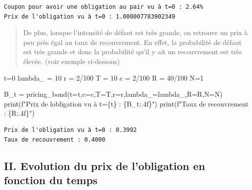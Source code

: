 \documentclass[
  letterpaper,
  DIV=11,
  numbers=noendperiod]{scrartcl}
\newenvironment{Shaded}{\begin{snugshade}}{\end{snugshade}}
\newcommand{\BuiltInTok}[1]{\textcolor[rgb]{0.00,0.23,0.31}{#1}}
\newcommand{\DecValTok}[1]{\textcolor[rgb]{0.68,0.00,0.00}{#1}}
\newcommand{\NormalTok}[1]{\textcolor[rgb]{0.00,0.23,0.31}{#1}}
\newcommand{\OperatorTok}[1]{\textcolor[rgb]{0.37,0.37,0.37}{#1}}
\newcommand{\SpecialCharTok}[1]{\textcolor[rgb]{0.37,0.37,0.37}{#1}}
\newcommand{\SpecialStringTok}[1]{\textcolor[rgb]{0.13,0.47,0.30}{#1}}
\begin{document}
\begin{verbatim}
Coupon pour avoir une obligation au pair vu à t=0 : 2.64%
Prix de l'obligation vu à t=0 : 1.000007783902349
\end{verbatim}

\begin{quote}
De plus, lorsque l'intensité de défaut est très grande, on retrouve un
prix à peu près égal au taux de recouvrement. En effet, la probabilité
de défaut est très grande et donc la probabilité qu'il y ait un
recouvrement est très élevée. (voir exemple ci-dessous)
\end{quote}

\begin{Shaded}
\begin{Highlighting}[]
\NormalTok{t}\OperatorTok{=}\DecValTok{0}
\NormalTok{lambda\_ }\OperatorTok{=} \DecValTok{10}
\NormalTok{r }\OperatorTok{=} \DecValTok{2}\OperatorTok{/}\DecValTok{100}
\NormalTok{T }\OperatorTok{=} \DecValTok{10}
\NormalTok{c }\OperatorTok{=} \DecValTok{2}\OperatorTok{/}\DecValTok{100}
\NormalTok{R }\OperatorTok{=} \DecValTok{40}\OperatorTok{/}\DecValTok{100}
\NormalTok{N}\OperatorTok{=}\DecValTok{1}


\NormalTok{B\_t }\OperatorTok{=}\NormalTok{ pricing\_bond(t}\OperatorTok{=}\NormalTok{t,c}\OperatorTok{=}\NormalTok{c,T}\OperatorTok{=}\NormalTok{T,r}\OperatorTok{=}\NormalTok{r,lambda\_}\OperatorTok{=}\NormalTok{lambda\_,R}\OperatorTok{=}\NormalTok{R,N}\OperatorTok{=}\NormalTok{N)}
\BuiltInTok{print}\NormalTok{(}\SpecialStringTok{f"Prix de l\textquotesingle{}obligation vu à t=}\SpecialCharTok{\{}\NormalTok{t}\SpecialCharTok{\}}\SpecialStringTok{ : }\SpecialCharTok{\{}\NormalTok{B\_t}\SpecialCharTok{:.4f\}}\SpecialStringTok{"}\NormalTok{)}
\BuiltInTok{print}\NormalTok{(}\SpecialStringTok{f"Taux de recouvrement : }\SpecialCharTok{\{}\NormalTok{R}\SpecialCharTok{:.4f\}}\SpecialStringTok{"}\NormalTok{)}
\end{Highlighting}
\end{Shaded}

\begin{verbatim}
Prix de l'obligation vu à t=0 : 0.3992
Taux de recouvrement : 0.4000
\end{verbatim}

\subsection{II. Evolution du prix de l'obligation en fonction du
temps}\label{ii.-evolution-du-prix-de-lobligation-en-fonction-du-temps}
\end{document}
